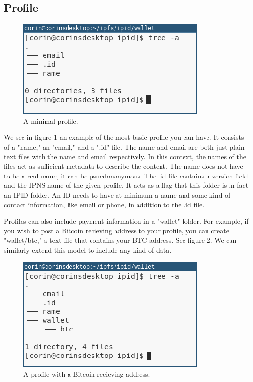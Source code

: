 \documentclass{article}
\begin{document}
\subsection{Profile}

\begin{figure}[h]
  \centering
  \includegraphics[width=.5\textwidth]{resources/basic_profile.png}
  \caption{A minimal profile.}
\end{figure}

We see in figure 1 an example of the most basic profile you can have. It consists of a "name," an "email," and a ".id" file. The name and email are both just plain text files with the name and email respectively. In this context, the names of the files act as sufficient metadata to describe the content. The name does not have to be a real name, it can be psuedononymous. The .id file contains a version field and the IPNS name of the given profile. It acts as a flag that this folder is in fact an IPID folder. An ID needs to have at minimum a name and some kind of contact information, like email or phone, in addition to the .id file. \par
Profiles can also include payment information in a "wallet" folder. For example, if you wish to post a Bitcoin recieving address to your profile, you can create "wallet/btc," a text file that contains your BTC address. See figure 2. We can similarly extend this model to include any kind of data.

\begin{figure}[h]
  \centering
  \includegraphics[width=.5\textwidth]{resources/basic_profile_wallet.png}
  \caption{A profile with a Bitcoin recieving address.}
\end{figure}
\end{document}
